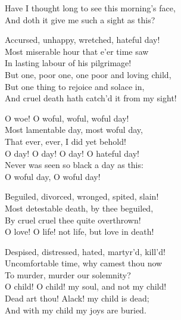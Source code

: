 \begin{speech}
Have I thought long to see this morning's face, \\

And doth it give me such a sight as this? \\
\end{speech}
\begin{speech}
Accursed, unhappy, wretched, hateful day! \\
Most miserable hour that e'er time saw \\
In lasting labour of his pilgrimage! \\
But one, poor one, one poor and loving child, \\
But one thing to rejoice and solace in, \\
And cruel death hath catch'd it from   my sight! \\
\end{speech}
\begin{speech}
O woe! O woful, woful, woful day! \\
Most lamentable day, most woful day, \\
That ever, ever, I did yet behold! \\
O day! O day! O day! O hateful day! \\
Never was seen so black a day as this: \\
O woful day, O woful day! \\
\end{speech}
\begin{speech}
Beguiled, divorced, wronged, spited, slain! \\
Most detestable death, by thee beguiled, \\
By cruel cruel thee quite overthrown! \\
O love! O life! not life, but love in death! \\
\end{speech}
\begin{speech}
Despised, distressed, hated, martyr'd, kill'd! \\

Uncomfortable time, why camest thou now \\
To murder, murder our solemnity? \\
O child! O child! my soul, and not my child! \\
Dead art thou!   Alack! my child is dead; \\
And with my child my joys are buried. \\
\end{speech}
